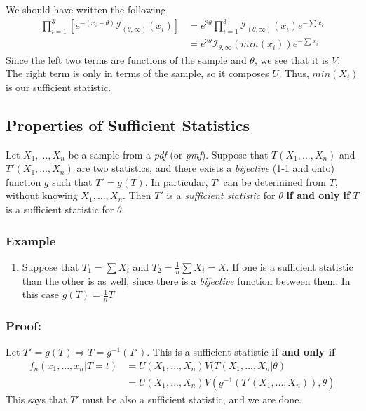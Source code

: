 \documentclass{article}
\begin{document}
\begin{enumerate}
    We should have written the following
    \begin{equation*}
    \begin{split}
        \prod_{i=1}^3 \left[ e^{-(x_i-\theta)} \mathcal{I}_{(\theta,\infty)}(x_i)\right] &= e^{3\theta}\prod_{i=1}^3 \mathcal{I}_{(\theta,\infty)}(x_i) e^{-\sum x_i}\\
        &= e^{3\theta}\mathcal{I}_{\theta,\infty}(min(x_i)) e^{-\sum x_i}
    \end{split}
    \end{equation*}
    Since the left two terms are functions of the sample and $\theta$, we see that it is $V$. The right term is only in terms of the sample, so it composes $U$. Thus, $min(X_i)$ is our sufficient statistic.
\end{enumerate}
\subsection{Properties of Sufficient Statistics}
Let $X_1,...,X_n$ be a sample from a \textit{pdf} (or \textit{pmf}). Suppose that $T(X_1,...,X_n)$ and $T'(X_1,...,X_n)$ are two statistics, and there exists a \textit{bijective} (1-1 and onto) function $g$ such that $T'=g(T)$. In particular, $T'$ can be determined from $T$, without knowing $X_1,...,X_n$. Then $T'$ is a \textit{sufficient statistic} for $\theta$ \textbf{if and only if} $T$ is a sufficient statistic for $\theta$.
\subsubsection*{Example}
\begin{enumerate}
    \item Suppose that $T_1 = \sum X_i$ and $T_2 = \frac{1}{n}\sum X_i = \overline{X}$. If one is a sufficient statistic than the other is as well, since there is a \textit{bijective} function between them. In this case $g(T) = \frac{1}{n}T$
\end{enumerate}
\subsubsection*{Proof:}
Let $T' = g(T) \Rightarrow T=g^{-1}(T')$. This is a sufficient statistic \textbf{if and only if}
\begin{equation*}
\begin{split}
    f_n(x_1,...,x_n|T=t) &= U(X_1,...,X_n)V(T(X_1,...,X_n|\theta)\\
    &= U(X_1,...,X_n) V(g^{-1}(T'(X_1,...,X_n)),\theta)
\end{split}
\end{equation*}
This says that $T'$ must be also a sufficient statistic, and we are done.
\end{document}
